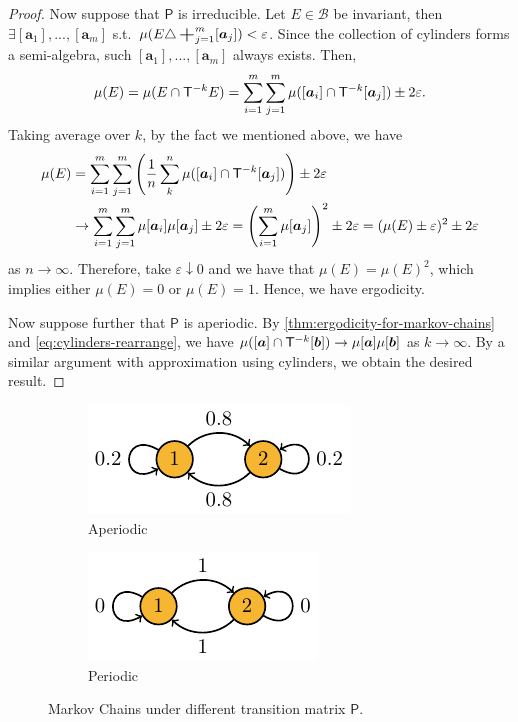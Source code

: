\documentclass[a4paper]{article}
\begin{document}
\begin{proof}
	Now suppose that $\mathsf{P}$ is irreducible.
	Let $E\in\mathcal{B}$ be invariant,
	then $\exists[\boldsymbol{a}_1],...,[\boldsymbol{a}_m]$ s.t.\ $\mu(E\triangle\bigplus_{j=1}^{m}[\boldsymbol{a}_{j}])<\varepsilon$.
	Since the collection of cylinders forms a semi-algebra,
	such $[\boldsymbol{a}_1],...,[\boldsymbol{a}_m]$ always exists.
	Then,
	\begin{align*}
		\mu(E)
		= \mu(E\cap \mathsf{T}\inv[k]E)
		= \sum_{i=1}^{m} \sum_{j=1}^{m} \mu([\boldsymbol{a}_i]\cap \mathsf{T}\inv[k][\boldsymbol{a}_j]) \pm 2\varepsilon.
	\end{align*}
	Taking average over $k$, by the fact we mentioned above, we have
	\begin{align*}
		\mu(E)
		&=
		\sum_{i=1}^{m} \sum_{j=1}^{m}
		\left(
		\frac1n \sum_{k}^{n} \mu([\boldsymbol{a}_i]\cap \mathsf{T}\inv[k][\boldsymbol{a}_j])
		\right)
		\pm 2\varepsilon \nonumber\\
		&\to
		\sum_{i=1}^{m} \sum_{j=1}^{m}
		\mu[\boldsymbol{a}_i] \mu[\boldsymbol{a}_j] \pm 2\varepsilon
		= \left( \sum_{i=1}^{m} \mu[\boldsymbol{a}_j] \right)^2 \pm 2\varepsilon
		= (\mu(E)\pm\varepsilon)^2 \pm 2\varepsilon
	\end{align*}
	as $n\to\infty$.
	Therefore,
	take $\varepsilon\downarrow0$ and we have that $\mu(E)=\mu(E)^2$,
	which implies either $\mu(E)=0$ or $\mu(E)=1$.
	Hence, we have ergodicity.

	Now suppose further that $\mathsf{P}$ is aperiodic.
	By \autoref{thm:ergodicity-for-markov-chains} and \eqref{eq:cylinders-rearrange},
	we have
	$\mu([\boldsymbol{a}]\cap\mathsf{T}\inv[k][\boldsymbol{b}])
	\to \mu[\boldsymbol{a}] \mu[\boldsymbol{b}]$ as $k\to\infty$.
	By a similar argument with approximation using cylinders,
	we obtain the desired result.
\end{proof}

\begin{figure}[h]
	\centering
	\begin{subfigure}{0.4\textwidth}
		\centering
		\includegraphics[scale=1]{figures/markov-periodic.pdf}
		\caption{Aperiodic}
		\label{fig:aperiodic}
	\end{subfigure}
	\begin{subfigure}{0.4\textwidth}
		\centering
		\includegraphics[scale=1]{figures/markov-aperiodic.pdf}
		\caption{Periodic}
		\label{fig:periodic}
	\end{subfigure}
	\caption{Markov Chains under different transition matrix $\mathsf{P}$.}
	\label{fig:markov-chains}
\end{figure}
\end{document}
